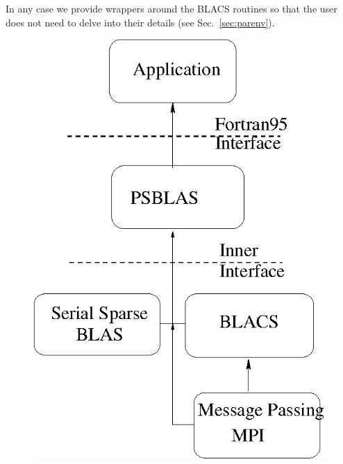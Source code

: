 In any case we provide wrappers around the BLACS routines so that the
user does not need to delve into their details (see Sec.~\ref{sec:parenv}).

\begin{figure}[h] 
\begin{center}
\ifcase\pdfoutput
\includegraphics[scale=0.65]{figures/psblas.eps}
\or

\end{center}
\end{figure}
